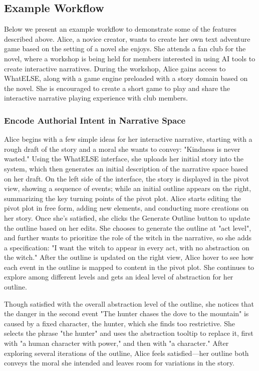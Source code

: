 

\subsection{Example Workflow}

Below we present an example workflow to demonstrate some of the features described above. Alice, a novice creator, wants to create her own text adventure game based on the setting of a novel she enjoys. She attends a fan club for the novel, where a workshop is being held for members interested in using AI tools to create interactive narratives. During the workshop, Alice gains access to WhatELSE, along with a game engine preloaded with a story domain based on the novel. She is encouraged to create a short game to play and share the interactive narrative playing experience with club members.

\subsubsection{Encode Authorial Intent in Narrative Space} Alice begins with a few simple ideas for her interactive narrative, starting with a rough draft of the story and a moral she wants to convey: "Kindness is never wasted." Using the WhatELSE interface, she uploads her initial story into the system, which then generates an initial description of the narrative space based on her draft. On the left side of the interface, the story is displayed in the pivot view, showing a sequence of events; while an initial outline appears on the right, summarizing the key turning points of the pivot plot. Alice starts editing the pivot plot in free form, adding new elements, and conducting more creations on her story. Once she's satisfied, she clicks the Generate Outline button to update the outline based on her edits. She chooses to generate the outline at "act level", and further wants to prioritize the role of the witch in the narrative, so she adds a specification: "I want the witch to appear in every act, with no abstraction on the witch." After the outline is updated on the right view, Alice hover to see how each event in the outline is mapped to content in the pivot plot. She continues to explore among different levels and gets an ideal level of abstraction for her outline.

Though satisfied with the overall abstraction level of the outline, she notices that the danger in the second event "The hunter chases the dove to the mountain" is caused by a fixed character, the hunter, which she finds too restrictive. She selects the phrase "the hunter" and uses the abstraction tooltip to replace it, first with "a human character with power," and then with "a character." After exploring several iterations of the outline, Alice feels satisfied—her outline both conveys the moral she intended and leaves room for variations in the story.

